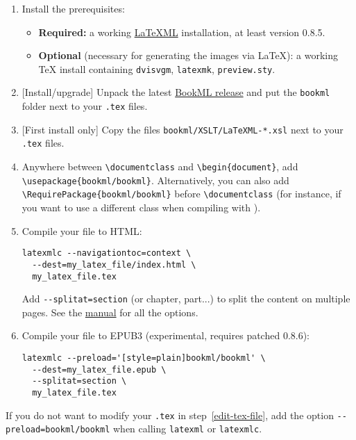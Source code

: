 \documentclass[a4paper,british]{article}
\def\ltxinline{\lstinline[style=bookml]}
\begin{document}
\begin{enumerate}
  \item Install the prerequisites:
  \begin{itemize}
    \item \textbf{Required:} a working \href{https://dlmf.nist.gov/LaTeXML/}{LaTeXML} installation, at least version 0.8.5.
    \item \textbf{Optional} (necessary for generating the images via \LaTeX): a working \TeX{} install containing \lstinline|dvisvgm|, \lstinline|latexmk|, \lstinline|preview.sty|.
  \end{itemize}
  \item {}[Install/upgrade] Unpack the latest \href{https://github.com/vlmantova/bookml/releases}{BookML release} and put the \lstinline|bookml| folder next to your \lstinline|.tex| files.
  \item {}[First install only] Copy the files \lstinline|bookml/XSLT/LaTeXML-*.xsl| next to your \lstinline|.tex| files.
  \item \label{edit-tex-file} Anywhere between \ltxinline|\documentclass| and \ltxinline|\begin{document}|, add \ltxinline|\usepackage{bookml/bookml}|. Alternatively, you can also add \ltxinline|\RequirePackage{bookml/bookml}| before \ltxinline|\documentclass| (for instance, if you want to use a different class when compiling with \LaTeXML{}).
  \item Compile your file to HTML:
    \begin{lstlisting}
latexmlc --navigationtoc=context \
  --dest=my_latex_file/index.html \
  my_latex_file.tex
    \end{lstlisting}
    Add \ltxinline|--splitat=section| (or chapter, part...) to split the content on multiple pages. See the \LaTeXML{} \href{https://dlmf.nist.gov/LaTeXML/manual/usage/}{manual} for all the options.
  \item Compile your file to EPUB3 (experimental, requires patched \LaTeXML{} 0.8.6):
    \begin{lstlisting}
latexmlc --preload='[style=plain]bookml/bookml' \
  --dest=my_latex_file.epub \
  --splitat=section \
  my_latex_file.tex
    \end{lstlisting}
\end{enumerate}

If you do not want to modify your \lstinline|.tex| in step~\ref{edit-tex-file}, add the option \lstinline|--preload=bookml/bookml| when calling \lstinline|latexml| or \lstinline|latexmlc|.
\end{document}
